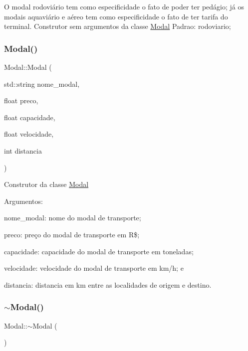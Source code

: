 O modal rodoviário tem como especificidade o fato de poder ter pedágio; já os modais aquaviário e aéreo tem como especificidade o fato de ter tarifa do terminal. Construtor sem argumentos da classe \hyperlink{classModal}{Modal} Padrao\+: rodoviario;\mbox{\label{classModal_a17560766811007d0af99fd6099325d52}} 
\subsubsection{\texorpdfstring{Modal()}{Modal()}\hspace{0.1cm}{\footnotesize\ttfamily [2/2]}}
{\footnotesize\ttfamily Modal\+::\+Modal (\begin{DoxyParamCaption}\item[{std\+::string}]{nome\+\_\+modal,  }\item[{float}]{preco,  }\item[{float}]{capacidade,  }\item[{float}]{velocidade,  }\item[{int}]{distancia }\end{DoxyParamCaption})}

Construtor da classe \hyperlink{classModal}{Modal}

Argumentos\+:
\begin{DoxyItemize}
\item nome\+\_\+modal\+: nome do modal de transporte;
\item preco\+: preço do modal de transporte em R\$;
\item capacidade\+: capacidade do modal de transporte em toneladas;
\item velocidade\+: velocidade do modal de transporte em km/h; e
\item distancia\+: distancia em km entre as localidades de origem e destino.
\end{DoxyItemize}\mbox{\label{classModal_a4a2e7830211c07075078b5d5186dab54}} 
\subsubsection{\texorpdfstring{$\sim$\+Modal()}{~Modal()}}
{\footnotesize\ttfamily Modal\+::$\sim$\+Modal (\begin{DoxyParamCaption}{ }\end{DoxyParamCaption})}

